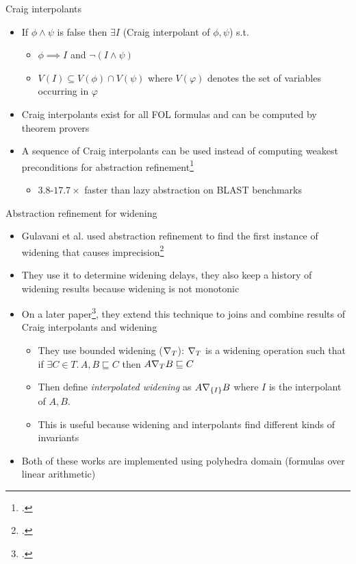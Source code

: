 \documentclass[aspectratio=169]{beamer}
\begin{document}
\begin{frame}{Craig interpolants}
  \begin{itemize}[<+->]
  \item If $\phi \wedge \psi$ is false then $\exists I$ (Craig interpolant of $\phi, \psi$) s.t.
    \begin{itemize}[<+->]
    \item $\phi \implies I$ and $\neg (I \wedge \psi)$
    \item $V(I) \subseteq V(\phi) \cap V(\psi)$ where $V(\varphi)$ denotes the set of variables occurring in $\varphi$
    \end{itemize}
  \item Craig interpolants exist for all FOL formulas and can be computed by theorem provers
  \item A sequence of Craig interpolants can be used instead of computing weakest preconditions for abstraction refinement\footcite{mcmillan2006lazy}\pause
    \begin{itemize}
    \item $3.8$-$17.7\times$ faster than lazy abstraction on BLAST benchmarks
    \end{itemize}
  \end{itemize}
\end{frame}

\begin{frame}{Abstraction refinement for widening}
  \small
  \begin{itemize}[<+->]
  \item Gulavani et al. used abstraction refinement to find the first instance of widening that causes imprecision\footcite{gulavani2006counterexample}
  \item They use it to determine widening delays, they also keep a history of widening results because widening is not monotonic
  \item On a later paper\footcite{gulavani2008automatically}, they extend this technique to joins and combine results of Craig interpolants and widening
    \begin{itemize}\footnotesize
    \item They use bounded widening ($\nabla_T$): $\nabla_T$ is a widening operation such that\\ if $\exists C \in T.\, A, B \sqsubseteq C$ then $A \nabla_T B \sqsubseteq C$
    \item Then define \emph{interpolated widening} as $A \nabla_{\left\{I\right\}} B$ where $I$ is the interpolant of $A, B$.
    \item This is useful because widening and interpolants find different kinds of invariants
    \end{itemize}
  \item Both of these works are implemented using polyhedra domain (formulas over linear arithmetic)
  \end{itemize}
\end{frame}
\end{document}
